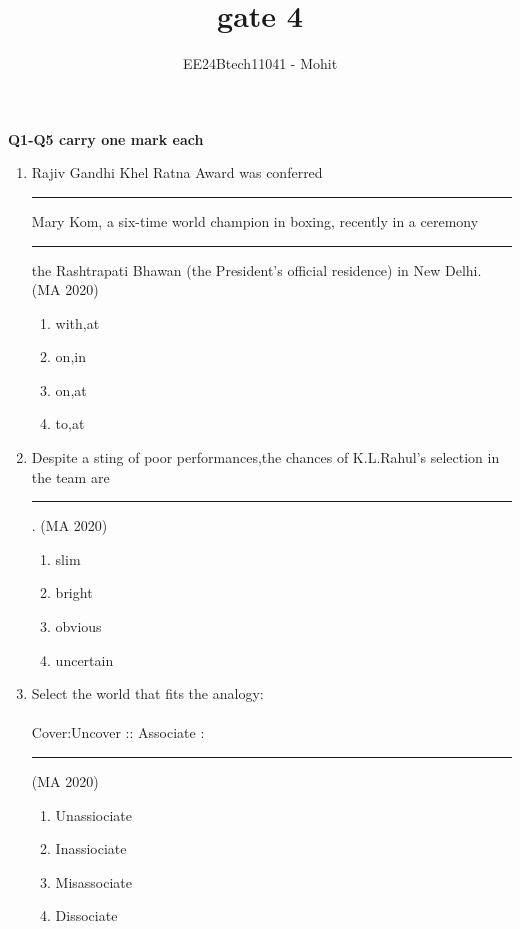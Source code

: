 \documentclass[journal,12pt,onecolumn]{IEEEtran}
\theoremstyle{remark}
\begin{document}
\title{gate 4}
\author{EE24Btech11041 - Mohit}
\maketitle
\renewcommand{\thefigure}{\theenumi}
\renewcommand{\thetable}{\theenumi}

\textbf{Q1-Q5 carry one mark each}
\begin{enumerate}
\item Rajiv Gandhi Khel Ratna Award was conferred \rule{2cm}{0.4pt} Mary Kom, a six-time world champion in boxing, recently in a ceremony \rule{2cm}{0.4pt} the Rashtrapati Bhawan (the President's official residence) in New Delhi.
\hfill{(MA 2020)}

\begin{enumerate}
\item with,at
\item on,in
\item on,at
\item to,at
\end{enumerate}

\item Despite a sting of poor performances,the chances of K.L.Rahul's selection in the team are \rule{2cm}{0.4pt} .
\hfill{(MA 2020)}
\begin{enumerate}
\item slim
\item bright
\item obvious
\item uncertain
\end{enumerate}

\item Select the world that fits the analogy:\\
\\
Cover:Uncover :: Associate :  \rule{2cm}{0.4pt}
\hfill{(MA 2020)}
\begin{enumerate}
\item Unassiociate
\item Inassiociate
\item Misassociate
\item Dissociate
\end{enumerate}


\end{enumerate}
\end{document}
